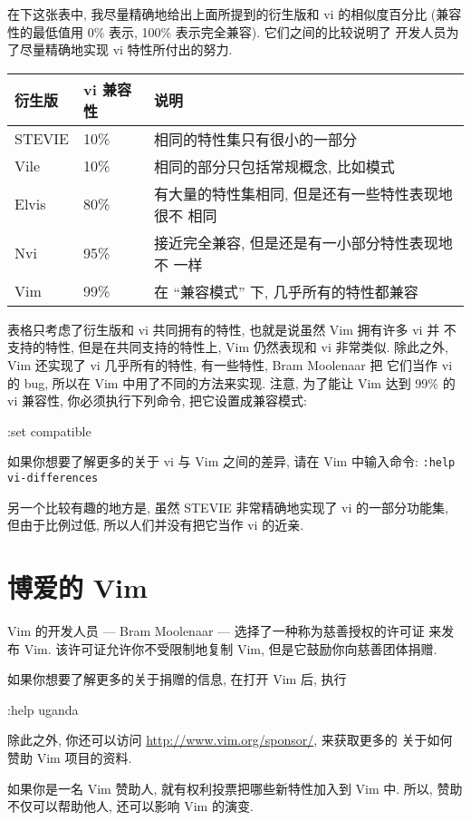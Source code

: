 在下这张表中, 我尽量精确地给出上面所提到的衍生版和 vi 的相似度百分比
(兼容性的最低值用 0\% 表示, 100\% 表示完全兼容). 它们之间的比较说明了
开发人员为了尽量精确地实现 vi 特性所付出的努力.
\begin{tabular}{lll}
    \hline
    衍生版  & vi 兼容性 & 说明 \\
    \hline
    STEVIE  & 10\%      & 相同的特性集只有很小的一部分 \\
    Vile    & 10\%      & 相同的部分只包括常规概念, 比如模式 \\
    Elvis   & 80\%      & 有大量的特性集相同, 但是还有一些特性表现地很不
        相同 \\
    Nvi     & 95\%      & 接近完全兼容, 但是还是有一小部分特性表现地不
        一样 \\
    Vim     & 99\%      & 在 ``兼容模式'' 下, 几乎所有的特性都兼容 \\
    \hline
\end{tabular}
表格只考虑了衍生版和 vi 共同拥有的特性, 也就是说虽然 Vim 拥有许多 vi 并
不支持的特性, 但是在共同支持的特性上, Vim 仍然表现和 vi 非常类似.
除此之外, Vim 还实现了 vi 几乎所有的特性, 有一些特性, Bram Moolenaar 把
它们当作 vi 的 bug, 所以在 Vim 中用了不同的方法来实现. 注意, 为了能让
Vim 达到 99\% 的 vi 兼容性, 你必须执行下列命令, 把它设置成兼容模式:
\begin{vimcmd}
:set compatible
\end{vimcmd}
\begin{warning}
    如果你想要了解更多的关于 vi 与 Vim 之间的差异, 请在 Vim 中输入命令:
    \texttt{:help vi-differences}
\end{warning}
另一个比较有趣的地方是, 虽然 STEVIE 非常精确地实现了 vi 的一部分功能集,
但由于比例过低, 所以人们并没有把它当作 vi 的近亲.

\section{博爱的 Vim}
\label{sec:vim_is_charityware}
Vim 的开发人员 --- Bram Moolenaar --- 选择了一种称为慈善授权的许可证
来发布 Vim. 该许可证允许你不受限制地复制 Vim, 但是它鼓励你向慈善团体捐赠.

如果你想要了解更多的关于捐赠的信息, 在打开 Vim 后, 执行
\begin{vimcmd}
:help uganda
\end{vimcmd}
除此之外, 你还可以访问 \url{http://www.vim.org/sponsor/}, 来获取更多的
关于如何赞助 Vim 项目的资料.

如果你是一名 Vim 赞助人, 就有权利投票把哪些新特性加入到 Vim 中. 所以, 
赞助不仅可以帮助他人, 还可以影响 Vim 的演变.

